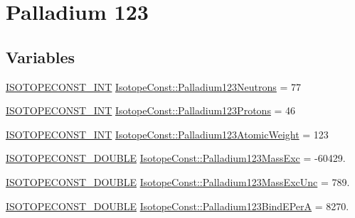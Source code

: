 \hypertarget{group___isotope_const-_palladium-_pd123}{}\section{Palladium 123}
\label{group___isotope_const-_palladium-_pd123}
\subsection*{Variables}
\begin{DoxyCompactItemize}
\item 
\mbox{\hyperlink{group___isotope_const-_macros_ga5f18360b3e99483a35c32d789e62621c}{I\+S\+O\+T\+O\+P\+E\+C\+O\+N\+S\+T\+\_\+\+I\+NT}} \mbox{\hyperlink{group___isotope_const-_palladium-_pd123_ga2ca96434cb47b204e03adab5346a787f}{Isotope\+Const\+::\+Palladium123\+Neutrons}} = 77
\item 
\mbox{\hyperlink{group___isotope_const-_macros_ga5f18360b3e99483a35c32d789e62621c}{I\+S\+O\+T\+O\+P\+E\+C\+O\+N\+S\+T\+\_\+\+I\+NT}} \mbox{\hyperlink{group___isotope_const-_palladium-_pd123_ga7de22534dc462efa57d6eea83cf27458}{Isotope\+Const\+::\+Palladium123\+Protons}} = 46
\item 
\mbox{\hyperlink{group___isotope_const-_macros_ga5f18360b3e99483a35c32d789e62621c}{I\+S\+O\+T\+O\+P\+E\+C\+O\+N\+S\+T\+\_\+\+I\+NT}} \mbox{\hyperlink{group___isotope_const-_palladium-_pd123_ga47c405d09491ba3b9cdc1abc2fe21a28}{Isotope\+Const\+::\+Palladium123\+Atomic\+Weight}} = 123
\item 
\mbox{\hyperlink{group___isotope_const-_macros_ga8f45a7272ce02c0b4c65c44636ed719a}{I\+S\+O\+T\+O\+P\+E\+C\+O\+N\+S\+T\+\_\+\+D\+O\+U\+B\+LE}} \mbox{\hyperlink{group___isotope_const-_palladium-_pd123_ga1c5571e91b2437f74fe350acc9d44d84}{Isotope\+Const\+::\+Palladium123\+Mass\+Exc}} = -\/60429.
\item 
\mbox{\hyperlink{group___isotope_const-_macros_ga8f45a7272ce02c0b4c65c44636ed719a}{I\+S\+O\+T\+O\+P\+E\+C\+O\+N\+S\+T\+\_\+\+D\+O\+U\+B\+LE}} \mbox{\hyperlink{group___isotope_const-_palladium-_pd123_ga43dca3fbec08866a231a71c55e9534e6}{Isotope\+Const\+::\+Palladium123\+Mass\+Exc\+Unc}} = 789.
\item 
\mbox{\hyperlink{group___isotope_const-_macros_ga8f45a7272ce02c0b4c65c44636ed719a}{I\+S\+O\+T\+O\+P\+E\+C\+O\+N\+S\+T\+\_\+\+D\+O\+U\+B\+LE}} \mbox{\hyperlink{group___isotope_const-_palladium-_pd123_gaf1625f72a07958b78545b9db5f3e4551}{Isotope\+Const\+::\+Palladium123\+Bind\+E\+PerA}} = 8270.
\item 

\end{DoxyCompactItemize}
